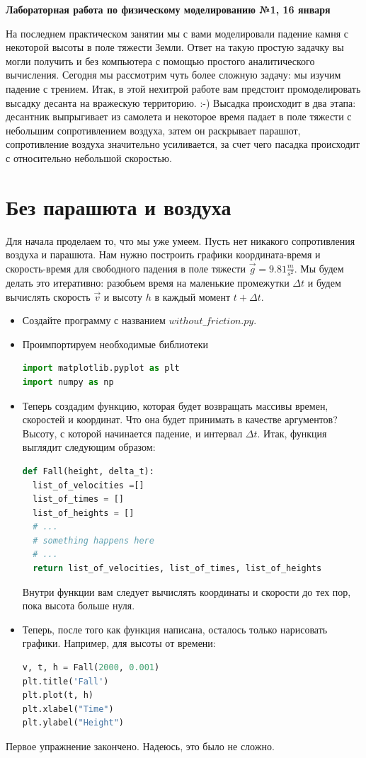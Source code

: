 \documentclass[a4paper,12pt]{article}
\begin{document}
\begin{center}
\Large{\textbf{Лабораторная работа по физическому моделированию №1, 16 января}}
\end{center}
На последнем практическом занятии мы с вами моделировали падение камня с некоторой высоты в поле тяжести Земли. Ответ на такую простую задачку вы могли получить и без компьютера с помощью простого аналитического вычисления. Сегодня мы рассмотрим чуть более сложную задачу: мы изучим падение с трением. Итак, в этой нехитрой работе вам предстоит промоделировать высадку десанта на вражескую территорию. :-) Высадка происходит в два этапа: десантник выпрыгивает из самолета и некоторое время падает в поле тяжести с небольшим сопротивлением воздуха, затем он раскрывает парашют, сопротивление воздуха значительно усиливается, за счет чего пасадка происходит с относительно небольшой скоростью.

\section{Без парашюта и воздуха }
Для начала проделаем то, что мы уже умеем. Пусть нет никакого сопротивления воздуха и парашюта. Нам нужно построить графики координата-время и скорость-время для свободного падения в поле тяжести $\vec{g} = 9.81 \frac{m}{s^2}$. Мы будем делать это итеративно: разобьем время на маленькие промежутки $\Delta t$ и будем вычислять скорость $\vec{v}$ и высоту $h$ в каждый момент $t + \Delta t$.
\begin{itemize}
\item Создайте программу с  названием $without\_friction.py$.
\item Проимпортируем необходимые библиотеки
\begin{lstlisting}[language=python]
import matplotlib.pyplot as plt
import numpy as np
\end{lstlisting}

\item Теперь создадим функцию, которая будет возвращать массивы времен, скоростей и координат. Что она будет принимать в качестве аргументов? Высоту, с которой начинается падение, и интервал $\Delta t$. Итак, функция выглядит следующим образом:
\begin{lstlisting}[language=python]
def Fall(height, delta_t):
  list_of_velocities =[]
  list_of_times = []
  list_of_heights = []
  # ...  
  # something happens here
  # ...
  return list_of_velocities, list_of_times, list_of_heights
\end{lstlisting}
Внутри функции вам следует вычислять координаты и скорости до тех пор, пока высота больше нуля.

\item Теперь, после того как функция написана, осталось только нарисовать графики. Например, для высоты от времени:
\begin{lstlisting}[language=python]
v, t, h = Fall(2000, 0.001)
plt.title('Fall')
plt.plot(t, h)
plt.xlabel("Time")
plt.ylabel("Height")
\end{lstlisting}
\end{itemize}
Первое упражнение закончено. Надеюсь, это было не сложно.
\end{document}
